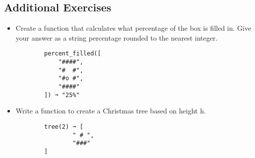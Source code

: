 \documentclass[11pt,a4paper]{article}
\begin{document}
\subsection*{Additional Exercises}
\begin{itemize}
    \item Create a function that calculates what percentage of the box is filled in. Give your answer as a string percentage rounded to the nearest integer.
    \begin{lstlisting}
        percent_filled([
            "####",
            "#  #",
            "#o #",
            "####"
        ]) ➞ "25%"
    \end{lstlisting}
    \item Write a function to create a Christmas tree based on height h.
    \begin{lstlisting}
        tree(2) ➞ [
                " # ",
                "###"
        ]
    \end{lstlisting}
\end{itemize}
\end{document}
